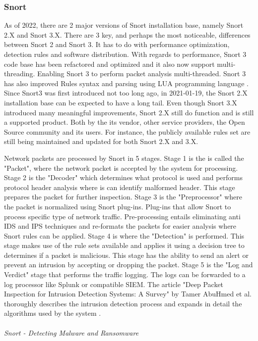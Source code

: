 
\subsubsection{Snort}

As of 2022, there are 2 major versions of Snort installation base, namely Snort 2.X and Snort 3.X. There are 3 key, and perhaps the most noticeable, differences between Snort 2 and Snort 3. It has to do with performance optimization, detection rules and software distribution. With regards to performance, Snort 3 code base has been refactored and optimized and it also now support multi-threading. Enabling Snort 3 to perform packet analysis multi-threaded. Snort 3 has also improved Rules syntax and parsing using LUA programming language \cite{Snort2020_MunshawJ}. Since Snort3 was first introduced not too long ago, in 2021-01-19, the Snort 2.X installation base can be expected to have a long tail. Even though Snort 3.X introduced many meaningful improvements, Snort 2.X still do function and is still a supported product. Both by the its vendor, other service providers, the Open Source community and its users. For instance, the publicly available rules set are still being maintained and updated for both Snort 2.X and 3.X. 

Network packets are processed by Snort in 5 stages. Stage 1 is the is called the "Packet", where the network packet is accepted by the system for processing. Stage 2 is the "Decoder" which determines what protocol is used and performs protocol header analysis where is can identify malformed header. This stage prepares the packet for further inspection. Stage 3 is the "Preprocessor" where the packet is normalized using Snort plug-ins. Plug-ins that allow Snort to process specific type of network traffic. Pre-processing entails eliminating anti IDS and IPS techniques and re-formats the packets for easier analysis where Snort rules can be applied. Stage 4 is where the "Detection" is performed. This stage makes use of the rule sets available and applies it using a decision tree to determines if a packet is malicious. This stage has the ability to send an alert or prevent an intrusion by accepting or dropping the packet. Stage 5 is the "Log and Verdict" stage that performs the traffic logging. The logs can be forwarded to a log processor like Splunk or compatible SIEM. The article "Deep Packet Inspection for Intrusion Detection Systems: A Survey" by Tamer AbuHmed et al. thoroughly describes the intrusion detection process and expands in detail the algorithms used by the system \cite{Tamer_et_al2008_Deep_Packet_Inspections}.\\
\\
\textit{Snort - Detecting Malware and Ransomware}

